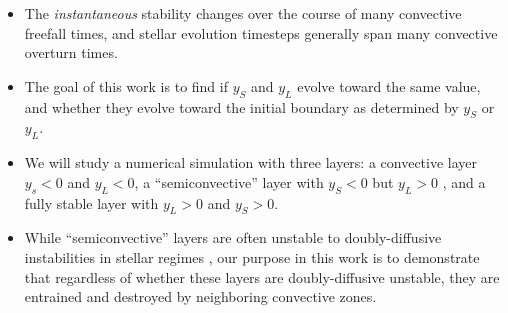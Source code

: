 
\begin{itemize}
\item The \emph{instantaneous} stability changes over the course of many convective freefall times, and stellar evolution timesteps generally span many convective overturn times.
\item The goal of this work is to find if $y_S$ and $y_L$ evolve toward the same value, and whether they evolve toward the initial boundary as determined by $y_S$ or $y_L$.
\item We will study a numerical simulation with three layers: a convective layer $y_s < 0$ and $y_L < 0$, a ``semiconvective'' \citep[see section 4 of][]{mesa2} \citep{salaris_cassisi_2017} layer with $y_S < 0$ but $y_L > 0$ \citep[which is stable to ODDC][]{garaud_2018}, and a fully stable layer with $y_L > 0$ and $y_S > 0$.
\item While ``semiconvective'' layers are often unstable to doubly-diffusive instabilities in stellar regimes \citep{moore_garaud_2016}, our purpose in this work is to demonstrate that regardless of whether these layers are doubly-diffusive unstable, they are entrained and destroyed by neighboring convective zones.
\end{itemize}

